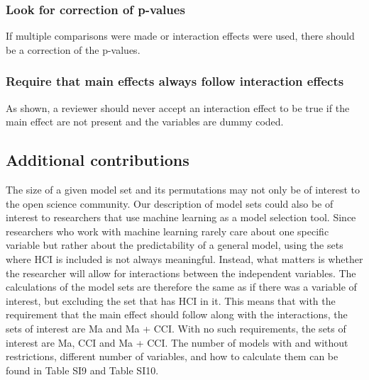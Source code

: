 \subsubsection{Look for correction of p-values}
If multiple comparisons were made or interaction effects were used, there should be a correction of the p-values.
\subsubsection{Require that main effects always follow interaction effects}
As shown, a reviewer should never accept an interaction effect to be true if the main effect are not present and the variables are dummy coded. 

\subsection{Additional contributions}
The size of a given model set and its permutations may not only be of interest to the open science community. Our description of model sets could also be of interest to researchers that use machine learning as a model selection tool. Since researchers who work with machine learning rarely care about one specific variable but rather about the predictability of a general model, using the sets where HCI is included is not always meaningful. Instead, what matters is whether the researcher will allow for interactions between the independent variables. The calculations of the model sets are therefore the same as if there was a variable of interest, but excluding the set that has HCI in it. This means that with the requirement that the main effect should follow along with the interactions, the sets of interest are Ma and Ma + CCI. With no such requirements, the sets of interest are Ma, CCI and Ma + CCI. The number of models with and without restrictions, different number of variables, and how to calculate them can be found in Table SI9 and Table SI10. 


 
